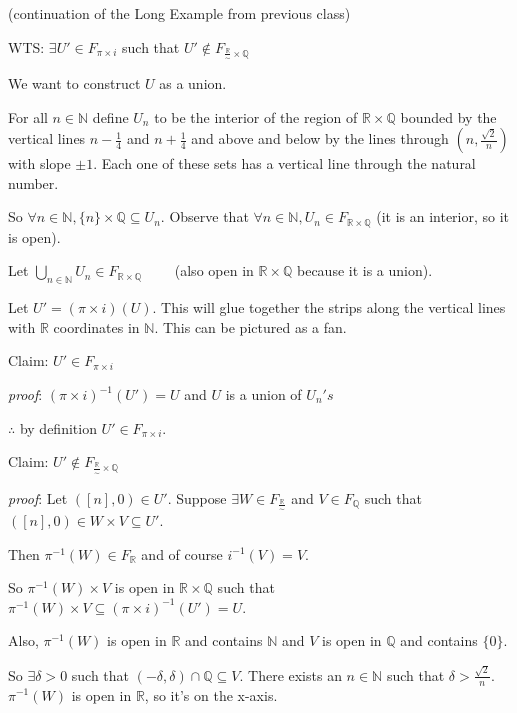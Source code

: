 \documentclass{article}
\begin{document}
(continuation of the Long Example from previous class)

WTS: $\exists  U' \in F_{\pi \times i}$ such that $U' \notin F_{\frac{\mathbb{R}}{\sim} \times \mathbb{Q}}$

We want to construct $U$ as a union.

For all $n\in \mathbb{N}$ define $U_n$ to be the interior of the region of $\mathbb{R}\times\mathbb{Q}$ bounded by the vertical lines $n-\frac{1}{4}$ and $n+\frac{1}{4}$ and above and below by the lines through $(n, \frac{\sqrt{2}}{n})$ with slope $\pm 1$. Each one of these sets has a vertical line through the natural number.

So $\forall n \in \mathbb{N}, \{n\}\times \mathbb{Q} \subseteq U_n$. Observe that $\forall n\in \mathbb{N}, U_n \in F_{\mathbb{R}\times\mathbb{Q}}$ (it is an interior, so it is open).

Let $\bigcup_{n \in\mathbb{N}} U_n \in F_{\mathbb{R}\times\mathbb{Q}} \qquad$ (also open in $\mathbb{R}\times\mathbb{Q}$ because it is a union).

Let $U' = (\pi \times i)(U).$ This will glue together the strips along the vertical lines with $\mathbb{R}$ coordinates in $\mathbb{N}$. This can be pictured as a fan.

\smallskip

Claim: $U' \in F_{\pi \times i}$

{\it proof}: $(\pi \times i)^{-1}(U') = U$ and $U$ is a union of $U_n 's$

$\therefore$ by definition $U' \in F_{\pi \times i}$.

\smallskip

Claim: $U' \notin F_{\frac{\mathbb{R}}{\sim} \times \mathbb{Q}}$

{\it proof}: Let $([n],0) \in U'$. Suppose $\exists W \in F_{\frac{\mathbb{R}}{\sim}}$ and $V \in F_{\mathbb{Q}}$ such that $([n], 0)\in W \times V \subseteq U'$.

Then $\pi^{-1}(W) \in F_{\mathbb{R}}$ and of course $i^{-1}(V) = V$.

So $\pi^{-1}(W) \times V$ is open in $\mathbb{R}\times \mathbb{Q}$ such that $\pi^{-1}(W) \times V \subseteq (\pi \times i)^{-1}(U') = U$.

Also, $\pi^{-1}(W)$ is open in $\mathbb{R}$ and contains $\mathbb{N}$ and $V$ is open in $\mathbb{Q}$ and contains $\{0\}$.

So $\exists \delta >0$ such that $(-\delta, \delta) \cap \mathbb{Q} \subseteq V$. There exists an $n\in \mathbb{N}$ such that $\delta > \frac{\sqrt{2}}{n}$. $\pi^{-1}(W)$ is open in $\mathbb{R}$, so it's on the x-axis.
\end{document}
